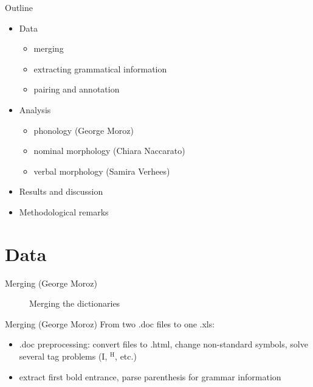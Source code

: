\begin{frame}{Outline}
\begin{itemize}
    \item Data 
    \begin{itemize}
        \item merging
        \item extracting grammatical information
        \item pairing and annotation
    \end{itemize}
    \item Analysis
    \begin{itemize}
        \item phonology (George Moroz)
        \item nominal morphology (Chiara Naccarato)
        \item verbal morphology (Samira Verhees)
    \end{itemize}
    \item Results and discussion
    \item Methodological remarks 
\end{itemize}
\end{frame}

\section{Data}
\begin{frame}{Merging (George Moroz)}
\begin{figure}[h]
\centering
{}
\caption{Merging the dictionaries}
\end{figure}
\end{frame}

\begin{frame}{Merging (George Moroz)}
From two .doc files to one .xls:
\begin{itemize}
    \item .doc preprocessing: convert files to .html, change non-standard symbols, solve several tag problems (I, $^\text{H}$, etc.)
    \item extract first bold entrance, parse parenthesis for grammar information
\end{itemize}
\end{frame}

